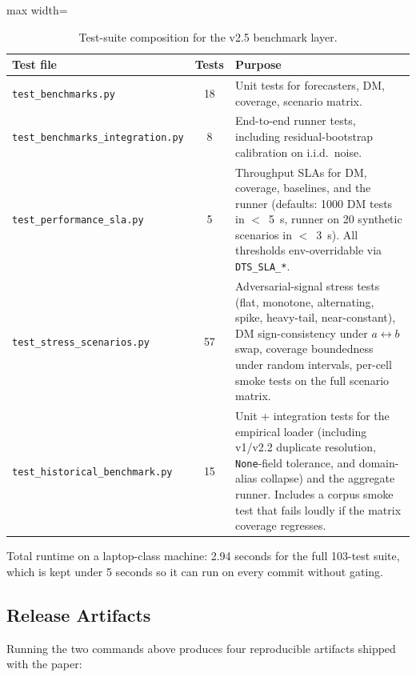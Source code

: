 \documentclass[12pt]{article}
\begin{document}
\begin{table}[H]
\centering
\caption{Test-suite composition for the v2.5 benchmark layer.}
\label{tab:repro_tests}
\begin{adjustbox}{max width=\textwidth}
\begin{tabular}{@{}p{5.5cm}cp{9cm}@{}}
\toprule
Test file & Tests & Purpose \\
\midrule
\texttt{test\_benchmarks.py} & 18 & Unit tests for forecasters, DM, coverage, scenario matrix. \\
\texttt{test\_benchmarks\_integration.py} &  8 & End-to-end runner tests, including residual-bootstrap calibration on i.i.d.\ noise. \\
\texttt{test\_performance\_sla.py} &  5 & Throughput SLAs for DM, coverage, baselines, and the runner (defaults: 1000 DM tests in $<$~5~s, runner on 20 synthetic scenarios in $<$~3~s). All thresholds env-overridable via \texttt{DTS\_SLA\_*}. \\
\texttt{test\_stress\_scenarios.py} & 57 & Adversarial-signal stress tests (flat, monotone, alternating, spike, heavy-tail, near-constant), DM sign-consistency under $a \leftrightarrow b$ swap, coverage boundedness under random intervals, per-cell smoke tests on the full scenario matrix. \\
\texttt{test\_historical\_benchmark.py} & 15 & Unit + integration tests for the empirical loader (including v1/v2.2 duplicate resolution, \texttt{None}-field tolerance, and domain-alias collapse) and the aggregate runner. Includes a corpus smoke test that fails loudly if the matrix coverage regresses. \\
\bottomrule
\end{tabular}
\end{adjustbox}
\end{table}

Total runtime on a laptop-class machine: 2.94 seconds for the full 103-test suite, which is kept under 5 seconds so it can run on every commit without gating.

\subsection{Release Artifacts}
\label{app:repro_artifacts}

Running the two commands above produces four reproducible artifacts shipped with the paper:
\end{document}
